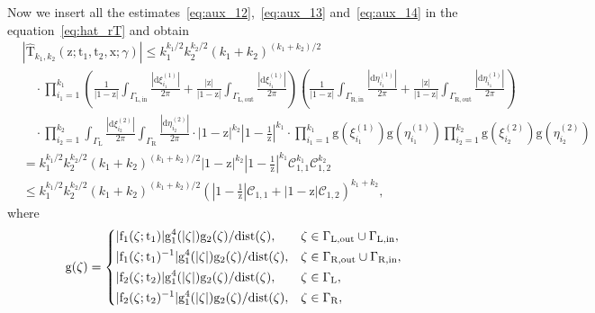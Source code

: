 \documentclass{article}
\numberwithin{equation}{section}
\newcommand{\CC}{\mathcal{C}}
\newcommand{\dg}{\mathrm{dist}}
\newcommand{\inn}{\mathrm{in}}
\newcommand{\LL}{\mathrm{L}}
\newcommand{\out}{\mathrm{out}}
\newcommand{\rg}{\mathrm{g}}
\newcommand{\RR}{\mathrm{R}}
\begin{document}
Now we insert all the estimates~\eqref{eq:aux_12},~\eqref{eq:aux_13} and~\eqref{eq:aux_14} in the equation~\eqref{eq:hat_rT} and obtain
\begin{equation}
	\label{eq:aux_15}
	\begin{split}
		&\left|\mathrm{\hat T}_{k_1,k_2}(\mathrm{z};\mathrm{t}_1,\mathrm{t}_2,\mathrm{x};\gamma)\right|
		\le k_1^{k_1/2}k_2^{k_2/2}(k_1+k_2)^{(k_1+k_2)/2}\\
		&\quad\cdot 
		\prod_{i_1=1}^{k_1}     
		\left(  \frac{1}{|1-\mathrm{z}|} \int_{\Gamma_{\LL,\inn}} 	    
		\frac{|\mathrm{d} \xi_{i_1}^{(1)}|}{2\pi}   
		+\frac{\mathrm{|z|}}{|1-\mathrm{z}|} \int_{\Gamma_{\LL,\out}} \frac{|\mathrm{d} \xi_{i_1}^{(1)}|}{2\pi}   
		\right)
		\left(  \frac{1}{|1-\mathrm{z}|} \int_{\Gamma_{\RR,\inn}} 	    
		\frac{|\mathrm{d} \eta_{i_1}^{(1)}|}{2\pi}   
		+\frac{\mathrm{|z|}}{|1-\mathrm{z}|} \int_{\Gamma_{\RR,\out}} \frac{|\mathrm{d} \eta_{i_1}^{(1)}|}{2\pi}   
		\right)
		\\
		&\quad \cdot 
		\prod_{i_2=1}^{k_2}  
		\int_{\Gamma_\LL} \frac{|\mathrm{d} \xi_{i_2}^{(2)}|}{2\pi} 
		\int_{\Gamma_\RR} \frac{|\mathrm{d} \eta_{i_2}^{(2)}|}{2\pi}  
		\cdot    
		\left|1-\mathrm{z}\right|^{k_2}
		\left|1-\frac{1}{\mathrm{z}}\right|^{k_1}
		\cdot 
		\prod_{i_1=1}^{k_1}\rg\left(\xi_{i_1}^{(1)}\right)\rg\left(\eta_{i_1}^{(1)}\right)\prod_{i_2=1}^{k_2}\rg\left(\xi_{i_2}^{(2)}\right)\rg\left(\eta_{i_2}^{(2)}\right)\\
		&=k_1^{k_1/2}k_2^{k_2/2}(k_1+k_2)^{(k_1+k_2)/2}\left|1-\mathrm{z}\right|^{k_2}
		\left|1-\frac{1}{\mathrm{z}}\right|^{k_1} \CC_{1,1}^{k_1}\CC_{1,2}^{k_2}\\
		&\le k_1^{k_1/2}k_2^{k_2/2}(k_1+k_2)^{(k_1+k_2)/2} \left(\left|1-\frac{1}{\mathrm{z}}\right|\CC_{1,1}+\left|1-\mathrm{z}\right|\CC_{1,2}\right)^{k_1+k_2},
	\end{split}
\end{equation}
where 
\begin{equation*}
	\rg(\zeta)=\begin{dcases}
		|\mathrm{f}_1(\zeta;\mathrm{t}_1)|\rg^4_1(|\zeta|)\rg_2(\zeta)/\dg(\zeta), & \zeta\in\Gamma_{\LL,\out}\cup\Gamma_{\LL,\inn},\\
		|\mathrm{f}_1(\zeta;\mathrm{t}_1)^{-1}|\rg^4_1(|\zeta|)\rg_2(\zeta)/\dg(\zeta), & \zeta\in\Gamma_{\RR,\out}\cup\Gamma_{\RR,\inn},\\
		|\mathrm{f}_2(\zeta;\mathrm{t}_2)|\rg^4_1(|\zeta|)\rg_2(\zeta)/\dg(\zeta), & \zeta\in\Gamma_{\LL},\\
		|\mathrm{f}_2(\zeta;\mathrm{t}_2)^{-1}|\rg^4_1(|\zeta|)\rg_2(\zeta)/\dg(\zeta), & \zeta\in\Gamma_{\RR},\\
	\end{dcases}
\end{equation*}
\end{document}
